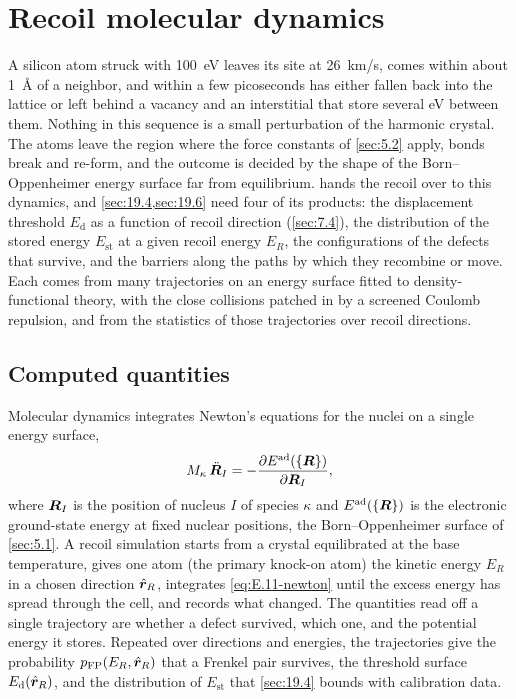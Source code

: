 \section{Recoil molecular dynamics}\label{app:E.11}

A silicon atom struck with \SI{100}{eV} leaves its site at \SI{26}{km/s}, comes within about \SI{1}{\angstrom} of a neighbor, and within a few picoseconds has either fallen back into the lattice or left behind a vacancy and an interstitial that store several eV between them. Nothing in this sequence is a small perturbation of the harmonic crystal. The atoms leave the region where the force constants of \cref{sec:5.2} apply, bonds break and re-form, and the outcome is decided by the shape of the Born--Oppenheimer energy surface far from equilibrium.  hands the recoil over to this dynamics, and \cref{sec:19.4,sec:19.6} need four of its products: the displacement threshold $E_{\mathrm{d}}$ as a function of recoil direction (\cref{sec:7.4}), the distribution of the stored energy $E_{\mathrm{st}}$ at a given recoil energy $E_R$, the configurations of the defects that survive, and the barriers along the paths by which they recombine or move. Each comes from many trajectories on an energy surface fitted to density-functional theory, with the close collisions patched in by a screened Coulomb repulsion, and from the statistics of those trajectories over recoil directions.

\subsection{Computed quantities}

Molecular dynamics integrates Newton's equations for the nuclei on a single energy surface,
\begin{equation}
  M_\kappa\,\ddot{\bm{R}}_I = -\frac{\partial E^{\mathrm{ad}}(\{\bm{R}\})}{\partial\bm{R}_I},
  \label{eq:E.11-newton}
\end{equation}
where $\bm{R}_I$ is the position of nucleus $I$ of species $\kappa$ and $E^{\mathrm{ad}}(\{\bm{R}\})$ is the electronic ground-state energy at fixed nuclear positions, the Born--Oppenheimer surface of \cref{sec:5.1}. A recoil simulation starts from a crystal equilibrated at the base temperature, gives one atom (the primary knock-on atom) the kinetic energy $E_R$ in a chosen direction $\hat{\bm{r}}_R$, integrates \cref{eq:E.11-newton} until the excess energy has spread through the cell, and records what changed. The quantities read off a single trajectory are whether a defect survived, which one, and the potential energy it stores. Repeated over directions and energies, the trajectories give the probability $p_{\mathrm{FP}}(E_R, \hat{\bm{r}}_R)$ that a Frenkel pair survives, the threshold surface $E_{\mathrm{d}}(\hat{\bm{r}}_R)$, and the distribution of $E_{\mathrm{st}}$ that \cref{sec:19.4} bounds with calibration data.

